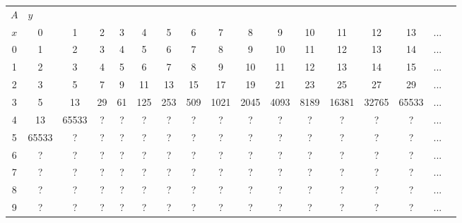\documentclass[preview]{standalone}
\begin{document}
\begin{tabular}{c|cccccccccccccccc}
$A$  & \multicolumn{10}{l}{$y$} \\
 $x$ & 0 & 1 & 2 & 3 & 4 & 5 & 6 & 7 & 8 & 9 & 10 & 11 & 12 & 13 & ...\\\hline
 0 & 1 & 2 & 3 & 4 & 5 & 6 & 7 & 8 & 9 & 10 & 11 & 12 & 13 & 14& ...\\
1 & 2 & 3 & 4 & 5 & 6 & 7 & 8 & 9 & 10 & 11 & 12 & 13 & 14 & 15& ...\\
2 & 3 & 5 & 7 & 9 & 11 & 13 & 15 & 17 & 19 & 21 & 23 & 25 & 27 & 29 & ...\\
3 & 5 & 13 & 29 & 61 & 125 & 253 & 509 &  1021 &  2045 &  4093 &  8189 &  16381& 32765 &  65533&...\\
4 & 13 &  65533 & ? & ? & ? & ? & ? & ? & ? & ? & ?  & ? & ? & ? & ...\\
5 &  65533 & ?& ? & ?  & ?  & ? & ? & ? & ? & ? & ?  & ? & ? & ? & ...\\
6 &  ? & ?& ? & ?  & ?  & ? & ? & ? & ? & ? & ?  & ? & ? & ? & ...\\
7 &  ? & ?& ? & ?  & ?  & ? & ? & ? & ? & ? & ?  & ? & ? & ? & ...\\
8 &  ? & ?& ? & ?  & ?  & ? & ? & ? & ? & ? & ?  & ? & ? & ? & ...\\
9 &  ? & ?& ? & ?  & ?  & ? & ? & ? & ? & ? & ?  & ? & ? & ? & ...\\
 \end{tabular}
\end{document}
